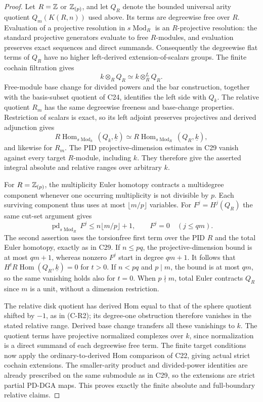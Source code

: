 \begin{proof}
Let $R=\mathbb Z$ or $\mathbb Z_{(p)}$, and let $Q_R$ denote the bounded
universal arity quotient $Q_m(K(R,n))$ used above. Its terms are
degreewise free over $R$. Evaluation of a projective resolution
in $s\operatorname{Mod}_R$ is an $R$-projective resolution:
the standard projective generators evaluate to free $R$-modules,
and evaluation preserves exact sequences and direct summands.
Consequently the degreewise flat terms of $Q_R$ have no higher
left-derived extension-of-scalars groups. The finite cochain
filtration gives
\[
 k\otimes_R Q_R\simeq k\otimes_R^L Q_R.
\]
Free-module base change for divided powers and the bar construction,
together with the basis-subset quotient of C24, identifies the left
side with $Q_k$. The relative quotient $R_m$ has the same
degreewise freeness and base-change properties. Restriction of
scalars is exact, so its left adjoint preserves projectives and
derived adjunction gives
\[
 R\operatorname{Hom}_{s\operatorname{Mod}_k}(Q_k,\underline k)
 \simeq
 R\operatorname{Hom}_{s\operatorname{Mod}_R}(Q_R,\underline k),
\]
and likewise for $R_m$. The PID projective-dimension estimates
in C29 vanish against every target $R$-module, including $k$.
They therefore give the asserted integral absolute and relative
ranges over arbitrary $k$.

For $R=\mathbb Z_{(p)}$, the multiplicity Euler homotopy contracts a
multidegree component whenever one occurring multiplicity is not
divisible by $p$. Each surviving component thus uses at most
$\lfloor m/p\rfloor$ variables. For $F^j=H^j(Q_R)$ the same
cut-set argument gives
\[
 \operatorname{pd}_{s\operatorname{Mod}_R}F^j
 \leq n\lfloor m/p\rfloor+1,
 \qquad F^j=0\quad(j\leq qm).
\]
The second assertion uses the torsionfree first term over the PID
$R$ and the total Euler homotopy, exactly as in C29. If $n\leq pq$,
the projective-dimension bound is at most $qm+1$, whereas nonzero
$F^j$ start in degree $qm+1$. It follows that
$H^{t}R\operatorname{Hom}(Q_R,\underline k)=0$ for $t>0$.
If $n<pq$ and $p\mid m$, the bound is at most $qm$, so the
same vanishing holds also for $t=0$. When $p\nmid m$, total
Euler contracts $Q_R$ since $m$ is a unit, without a dimension
restriction.

The relative disk quotient has derived Hom equal to that of the
sphere quotient shifted by $-1$, as in (C-R2); its degree-one
obstruction therefore vanishes in the stated relative range.
Derived base change transfers all these vanishings to $k$.
The quotient terms have projective normalized complexes over $k$,
since normalization is a direct summand of each degreewise free
term. The finite target conditions now apply the ordinary-to-derived
Hom comparison of C22, giving actual strict cochain extensions.
The smaller-arity product and divided-power identities are already
prescribed on the same submodule as in C29, so the extensions are
strict partial PD-DGA maps. This proves exactly the finite absolute
and full-boundary relative claims.
\end{proof}
